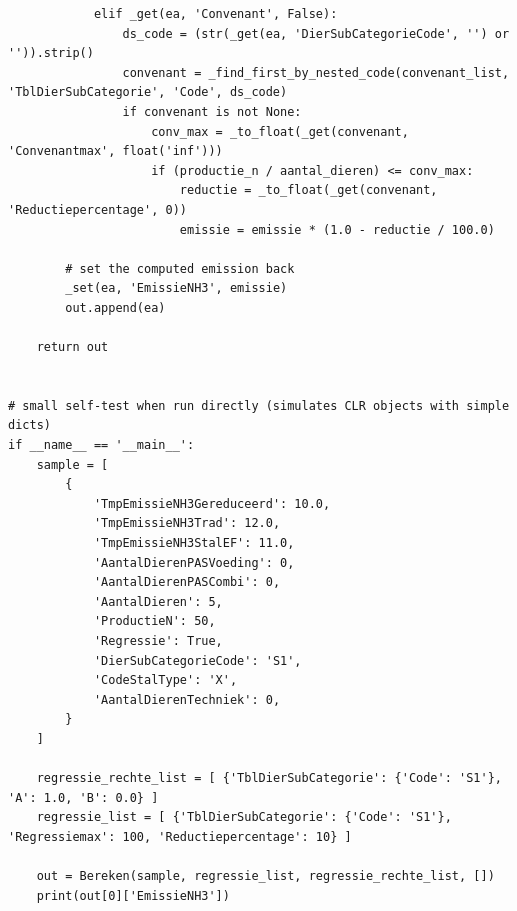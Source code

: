 \begin{verbatim}
            elif _get(ea, 'Convenant', False):
                ds_code = (str(_get(ea, 'DierSubCategorieCode', '') or '')).strip()
                convenant = _find_first_by_nested_code(convenant_list, 'TblDierSubCategorie', 'Code', ds_code)
                if convenant is not None:
                    conv_max = _to_float(_get(convenant, 'Convenantmax', float('inf')))
                    if (productie_n / aantal_dieren) <= conv_max:
                        reductie = _to_float(_get(convenant, 'Reductiepercentage', 0))
                        emissie = emissie * (1.0 - reductie / 100.0)

        # set the computed emission back
        _set(ea, 'EmissieNH3', emissie)
        out.append(ea)

    return out


# small self-test when run directly (simulates CLR objects with simple dicts)
if __name__ == '__main__':
    sample = [
        {
            'TmpEmissieNH3Gereduceerd': 10.0,
            'TmpEmissieNH3Trad': 12.0,
            'TmpEmissieNH3StalEF': 11.0,
            'AantalDierenPASVoeding': 0,
            'AantalDierenPASCombi': 0,
            'AantalDieren': 5,
            'ProductieN': 50,
            'Regressie': True,
            'DierSubCategorieCode': 'S1',
            'CodeStalType': 'X',
            'AantalDierenTechniek': 0,
        }
    ]

    regressie_rechte_list = [ {'TblDierSubCategorie': {'Code': 'S1'}, 'A': 1.0, 'B': 0.0} ]
    regressie_list = [ {'TblDierSubCategorie': {'Code': 'S1'}, 'Regressiemax': 100, 'Reductiepercentage': 10} ]

    out = Bereken(sample, regressie_list, regressie_rechte_list, [])
    print(out[0]['EmissieNH3'])

  \end{verbatim}
